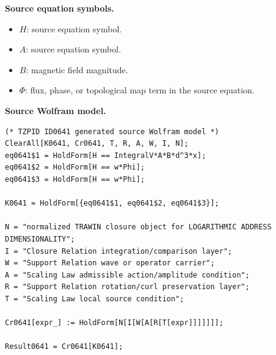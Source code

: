 \begin{minipage}[t]{0.49\linewidth}
\begingroup
\small
\raggedright
\textbf{Source equation symbols.}\par
\begin{itemize}[leftmargin=1.35em,itemsep=1pt,topsep=1pt,parsep=0pt]
    \item $H$: source equation symbol.
    \item $A$: source equation symbol.
    \item $B$: magnetic field magnitude.
    \item $\Phi$: flux, phase, or topological map term in the source equation.
\end{itemize}
\endgroup
\end{minipage}\hfill
\begin{minipage}[t]{0.47\linewidth}
\begingroup
\scriptsize
\raggedright
\textbf{Source Wolfram model.}\par
\begin{Verbatim}[fontsize=\tiny,breaklines=true,breakanywhere=true]
(* TZPID ID0641 generated source Wolfram model *)
ClearAll[K0641, Cr0641, T, R, A, W, I, N];
eq0641$1 = HoldForm[H == IntegralV*A*B*d^3*x];
eq0641$2 = HoldForm[H == w*Phi];
eq0641$3 = HoldForm[H == w*Phi];

K0641 = HoldForm[{eq0641$1, eq0641$2, eq0641$3}];

N = "normalized TRAWIN closure object for LOGARITHMIC ADDRESS DIMENSIONALITY";
I = "Closure Relation integration/comparison layer";
W = "Support Relation wave or operator carrier";
A = "Scaling Law admissible action/amplitude condition";
R = "Support Relation rotation/curl preservation layer";
T = "Scaling Law local source condition";

Cr0641[expr_] := HoldForm[N[I[W[A[R[T[expr]]]]]]];

Result0641 = Cr0641[K0641];
\end{Verbatim}
\endgroup
\end{minipage}

